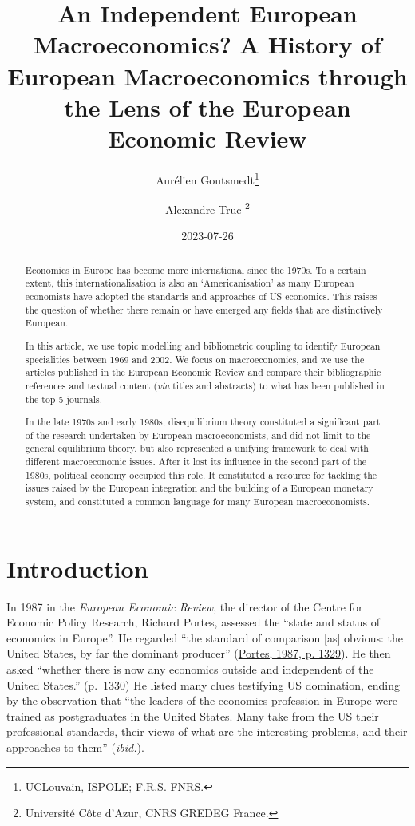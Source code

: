 \documentclass[
  12pt,
  onecolumn]{article}
\title{An Independent European Macroeconomics? A History of European
Macroeconomics through the Lens of the European Economic Review}
\author{Aurélien Goutsmedt\footnote{UCLouvain, ISPOLE; F.R.S.-FNRS.} \and Alexandre
Truc \footnote{Université Côte d'Azur, CNRS GREDEG France.}}
\date{2023-07-26}
\begin{document}
\maketitle
\begin{abstract}
Economics in Europe has become more international since the 1970s. To a
certain extent, this internationalisation is also an `Americanisation'
as many European economists have adopted the standards and approaches of
US economics. This raises the question of whether there remain or have
emerged any fields that are distinctively European.

In this article, we use topic modelling and bibliometric coupling to
identify European specialities between 1969 and 2002. We focus on
macroeconomics, and we use the articles published in the European
Economic Review and compare their bibliographic references and textual
content (\emph{via} titles and abstracts) to what has been published in
the top 5 journals.

In the late 1970s and early 1980s, disequilibrium theory constituted a
significant part of the research undertaken by European macroeconomists,
and did not limit to the general equilibrium theory, but also
represented a unifying framework to deal with different macroeconomic
issues. After it lost its influence in the second part of the 1980s,
political economy occupied this role. It constituted a resource for
tackling the issues raised by the European integration and the building
of a European monetary system, and constituted a common language for
many European macroeconomists.
\end{abstract}

\hypertarget{introduction}{%
\section{Introduction}\label{introduction}}

In 1987 in the \emph{European Economic Review}, the director of the
Centre for Economic Policy Research, Richard Portes, assessed the
``state and status of economics in Europe''. He regarded ``the standard
of comparison {[}as{]} obvious: the United States, by far the dominant
producer'' (\protect\hyperlink{ref-portes1987}{Portes, 1987, p. 1329}).
He then asked ``whether there is now any economics outside and
independent of the United States.'' (p.~1330) He listed many clues
testifying US domination, ending by the observation that ``the leaders
of the economics profession in Europe were trained as postgraduates in
the United States. Many take from the US their professional standards,
their views of what are the interesting problems, and their approaches
to them'' (\emph{ibid.}).
\end{document}
